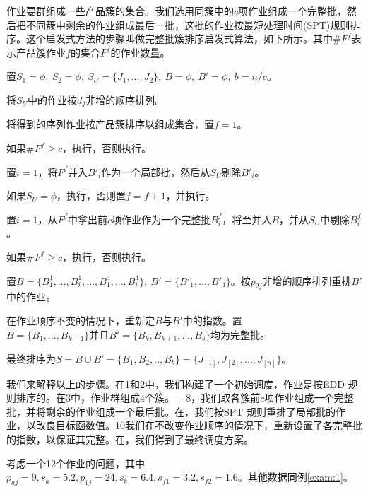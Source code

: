 作业要群组成一些产品簇的集合。我们选用同簇中的$c$项作业组成一个完整批，然后把不同簇中剩余的作业组成最后一批，这批的作业按最短处理时间(SPT)规则排序。这个启发式方法的步骤叫做完整批簇排序启发式算法，如下所示。其中$\# F^f$表示产品簇作业$f$的集合$F^f$的作业数量。
\begin{asparaenum}
\renewcommand{\labelenumi}{\heiti 步骤\theenumi~}
\item 置$S_1 = \phi,\ S_2=\phi,\ S_U = \{J_1,...,J_2\},\ B = \phi,\ B' = \phi,\ b=n/c$。
\item 将$S_U$中的作业按$d_j$非增的顺序排列。
\item 将得到的序列作业按产品簇排序以组成集合，置$f=1$。
\item 如果$\# F^f \geqslant c$，执行，否则执行。
\item 置$i=1$，将$F^f\text{并入}B'_i$作为一个局部批，然后从$S_U\text{剔除}B'_i$。
\item 如果$S_U = \phi$，执行，否则置$f=f+1$，并执行。
\item 置$i=1$，从$F^f$中拿出前$c$项作业作为一个完整批$B^f_i$，将至并入$B$，并从$S_U\text{中剔除}B^f_i$。
\item 如果$\# F^f \geqslant c$，执行，否则执行。
\item 置$B = \{B_1^1,...,B_i^1,...,B_1^4,...,B_i^4\},\ B' = \{B'_1,...,B'_4\}$。按$p_{2j}$非增的顺序排列重排$B'$中的作业。
\item 在作业顺序不变的情况下，重新定$B\text{与}B'$中的指数。置$B=\{B_1,...,B_{k-1}\}\text{并且}B' = \{B_k,B_{k+1},...,B_b\}$均为完整批。
\item 最终排序为$S=B\cup B' = \{B_1,B_2,..,B_b\} = \{J_{[1]},J_{[2]},...,J_{[n]}\}$。
\end{asparaenum}

我们来解释以上的步骤。在\Step1和\Step2中，我们构建了一个初始调度，作业是按EDD 规则排序的。在\Step3中，作业群组成4个簇。 -- 8，我们取各簇前$c$项作业组成一个完整批，并将剩余的作业组成一个最后批。在，我们按SPT 规则重排了局部批的作业，以改良目标函数值。\Step10我们在不改变作业顺序的情况下，重新设置了各完整批的指数，以保证其完整。在，我们得到了最终调度方案。
\begin{example}
考虑一个12个作业的问题，其中$p_{aj}=9,s_a=5.2,p_{1j}=24,s_b=6.4,s_{f1}=3.2,s_{f2}=1.6$。其他数据同例\ref{exam:1}。
\end{example}